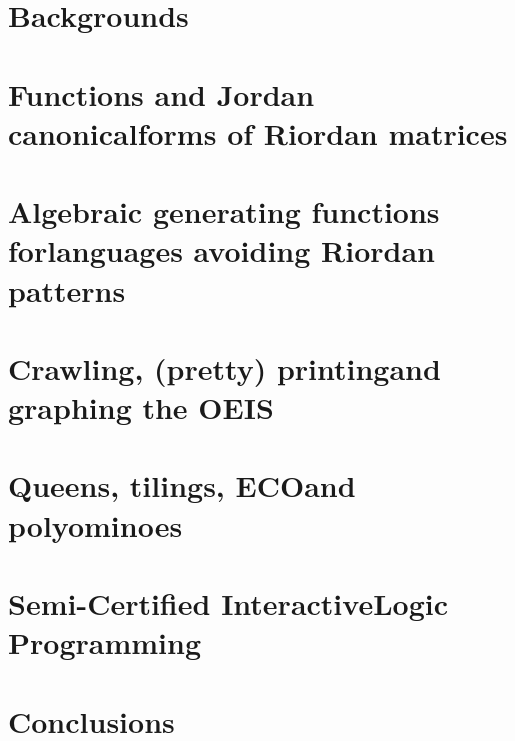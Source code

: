 \documentclass[a4paper,10pt]{tufte-book}
\begin{document}
\cleardoublepage

\chapter{Backgrounds}
\label{ch:backgrounds}



\chapter{Functions and Jordan canonical\newline forms of Riordan matrices}
\label{ch:Riordan-matrices-function}



\chapter{Algebraic generating functions for\newline languages avoiding Riordan patterns}
\label{ch:algebraic-gfs-languages-avoiding-Riordan-patterns}



\chapter{Crawling, (pretty) printing\newline and graphing the OEIS}
\label{ch:OEIS:tools}



\chapter{Queens, tilings, ECO\newline and polyominoes}
\label{ch:queens-tilings-polyominoes}



\chapter{Semi-Certified Interactive\newline Logic Programming}
\label{ch:scilp}



\chapter*{Conclusions}




\end{document}
